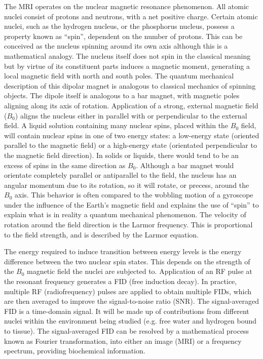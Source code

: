 \documentclass[11pt]{article}
\begin{document}
The MRI operates on the nuclear magnetic resonance phenomenon. All atomic nuclei consist of protons and neutrons, with a net positive charge. Certain atomic nuclei, such as the hydrogen nucleus, or the phosphorus nucleus, possess a property known as “spin”, dependent on the number of protons. This can be conceived as the nucleus spinning around its own axis although this is a mathematical analogy. The nucleus itself does not spin in the classical meaning but by virtue of its constituent parts induces a magnetic moment, generating a local magnetic field with north and south poles. The quantum mechanical description of this dipolar magnet is analogous to classical mechanics of spinning objects. The dipole itself is analogous to a bar magnet, with magnetic poles aligning along its axis of rotation. Application of a strong, external magnetic field ($B_0$) aligns the nucleus either in parallel with or perpendicular to the external field. A liquid solution containing many nuclear spins, placed within the $B_0$ field, will contain nuclear spins in one of two energy states: a low-energy state (oriented parallel to the magnetic field) or a high-energy state (orientated perpendicular to the magnetic field direction). In solids or liquids, there would tend to be an excess of spins in the same direction as $B_0$. Although a bar magnet would orientate completely parallel or antiparallel to the field, the nucleus has an angular momentum due to its rotation, so it will rotate, or precess, around the $B_0$ axis. This behavior is often compared to the wobbling motion of a gyroscope under the influence of the Earth's magnetic field and explains the use of “spin” to explain what is in reality a quantum mechanical phenomenon. The velocity of rotation around the field direction is the Larmor frequency. This is proportional to the field strength, and is described by the Larmor equation.

The energy required to induce transition between energy levels is the energy difference between the two nuclear spin states. This depends on the strength of the $B_0$ magnetic field the nuclei are subjected to. Application of an RF pulse at the resonant frequency generates a FID (free induction decay). In practice, multiple RF (radiofrequency) pulses are applied to obtain multiple FIDs, which are then averaged to improve the signal-to-noise ratio (SNR). The signal-averaged FID is a time-domain signal. It will be made up of contributions from different nuclei within the environment being studied (e.g. free water and hydrogen bound to tissue). The signal-averaged FID can be resolved by a mathematical process known as Fourier transformation, into either an image (MRI) or a frequency spectrum, providing biochemical information. 
\end{document}
